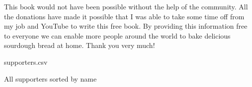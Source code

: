 This book would not have been possible without the help of the community.
All the donations have made it possible that I was able to take
some time off from my job and YouTube to write this free book.
By providing this information free to everyone we can
enable more people around the world to bake delicious
sourdough bread at home. Thank you very much!\\

\begin{filecontents}{supporters.csv}
  \end{filecontents}

  {\large All supporters sorted by name}


